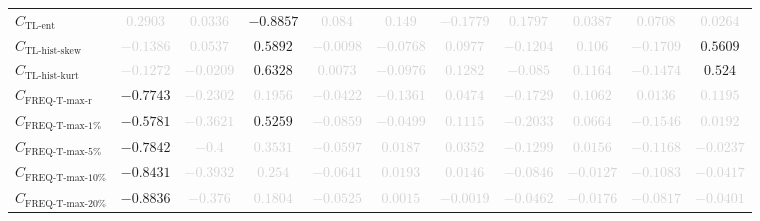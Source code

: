 \documentclass{standalone}
\newcommand{\tlentropyname}{\text{TL-ent}}
\newcommand{\tlentropy}{C_{\tlentropyname}}
\newcommand{\tlskewhistname}{\text{TL-hist-skew}}
\newcommand{\tlskewhist}{C_{\tlskewhistname}}
\newcommand{\tlkurthistname}{\text{TL-hist-kurt}}
\newcommand{\tlkurthist}{C_{\tlkurthistname}}
\newcommand{\freqmaxrname}{\text{FREQ-T-max-r}}
\newcommand{\freqmaxr}{C_{\freqmaxrname}}
\newcommand{\freqmaxonename}{\text{FREQ-T-max-1\%}}
\newcommand{\freqmaxone}{C_{\freqmaxonename}}
\newcommand{\freqmaxfivename}{\text{FREQ-T-max-5\%}}
\newcommand{\freqmaxfive}{C_{\freqmaxfivename}}
\newcommand{\freqmaxtenname}{\text{FREQ-T-max-10\%}}
\newcommand{\freqmaxten}{C_{\freqmaxtenname}}
\newcommand{\freqmaxtwentyname}{\text{FREQ-T-max-20\%}}
\newcommand{\freqmaxtwenty}{C_{\freqmaxtwentyname}}
\begin{document}
\begin{tabular}{lcccccccccc}
$\tlentropy$ & \textcolor{lightgray}{$0.2903$} & \textcolor{lightgray}{$0.0336$} & $-0.8857$ & \textcolor{lightgray}{$0.084$} & \textcolor{lightgray}{$0.149$} & \textcolor{lightgray}{$-0.1779$} & \textcolor{lightgray}{$0.1797$} & \textcolor{lightgray}{$0.0387$} & \textcolor{lightgray}{$0.0708$} & \textcolor{lightgray}{$0.0264$} \\ 
$\tlskewhist$ & \textcolor{lightgray}{$-0.1386$} & \textcolor{lightgray}{$0.0537$} & $0.5892$ & \textcolor{lightgray}{$-0.0098$} & \textcolor{lightgray}{$-0.0768$} & \textcolor{lightgray}{$0.0977$} & \textcolor{lightgray}{$-0.1204$} & \textcolor{lightgray}{$0.106$} & \textcolor{lightgray}{$-0.1709$} & $0.5609$ \\ 
$\tlkurthist$ & \textcolor{lightgray}{$-0.1272$} & \textcolor{lightgray}{$-0.0209$} & $0.6328$ & \textcolor{lightgray}{$0.0073$} & \textcolor{lightgray}{$-0.0976$} & \textcolor{lightgray}{$0.1282$} & \textcolor{lightgray}{$-0.085$} & \textcolor{lightgray}{$0.1164$} & \textcolor{lightgray}{$-0.1474$} & $0.524$ \\ 
$\freqmaxr$ & $-0.7743$ & \textcolor{lightgray}{$-0.2302$} & \textcolor{lightgray}{$0.1956$} & \textcolor{lightgray}{$-0.0422$} & \textcolor{lightgray}{$-0.1361$} & \textcolor{lightgray}{$0.0474$} & \textcolor{lightgray}{$-0.1729$} & \textcolor{lightgray}{$0.1062$} & \textcolor{lightgray}{$0.0136$} & \textcolor{lightgray}{$0.1195$} \\ 
$\freqmaxone$ & $-0.5781$ & \textcolor{lightgray}{$-0.3621$} & $0.5259$ & \textcolor{lightgray}{$-0.0859$} & \textcolor{lightgray}{$-0.0499$} & \textcolor{lightgray}{$0.1115$} & \textcolor{lightgray}{$-0.2033$} & \textcolor{lightgray}{$0.0664$} & \textcolor{lightgray}{$-0.1546$} & \textcolor{lightgray}{$0.0192$} \\ 
$\freqmaxfive$ & $-0.7842$ & \textcolor{lightgray}{$-0.4$} & \textcolor{lightgray}{$0.3531$} & \textcolor{lightgray}{$-0.0597$} & \textcolor{lightgray}{$0.0187$} & \textcolor{lightgray}{$0.0352$} & \textcolor{lightgray}{$-0.1299$} & \textcolor{lightgray}{$0.0156$} & \textcolor{lightgray}{$-0.1168$} & \textcolor{lightgray}{$-0.0237$} \\ 
$\freqmaxten$ & $-0.8431$ & \textcolor{lightgray}{$-0.3932$} & \textcolor{lightgray}{$0.254$} & \textcolor{lightgray}{$-0.0641$} & \textcolor{lightgray}{$0.0193$} & \textcolor{lightgray}{$0.0146$} & \textcolor{lightgray}{$-0.0846$} & \textcolor{lightgray}{$-0.0127$} & \textcolor{lightgray}{$-0.1083$} & \textcolor{lightgray}{$-0.0417$} \\ 
$\freqmaxtwenty$ & $-0.8836$ & \textcolor{lightgray}{$-0.376$} & \textcolor{lightgray}{$0.1804$} & \textcolor{lightgray}{$-0.0525$} & \textcolor{lightgray}{$0.0015$} & \textcolor{lightgray}{$-0.0019$} & \textcolor{lightgray}{$-0.0462$} & \textcolor{lightgray}{$-0.0176$} & \textcolor{lightgray}{$-0.0817$} & \textcolor{lightgray}{$-0.0401$} \\ 

\end{tabular}
\end{document}
